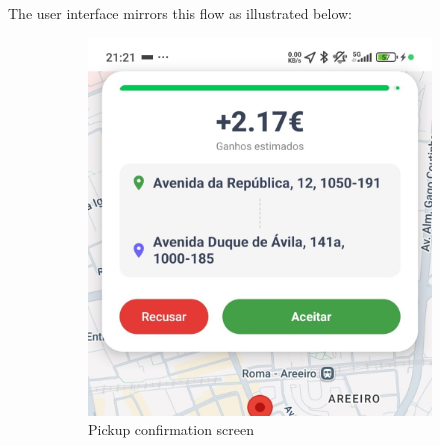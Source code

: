 \newpage

The user interface mirrors this flow as illustrated below:

\begin{figure}[H]
    \centering
    \begin{subfigure}[b]{0.48\textwidth}
        \centering
        \includegraphics[width=\textwidth]{images/IncomingRequest.jpeg}
        \caption{Pickup confirmation screen}
        \label{fig:incoming_request}
    \end{subfigure}
    \hfill
    \begin{subfigure}[b]{0.48\textwidth}
        \centering

\end{subfigure}
\end{figure}
